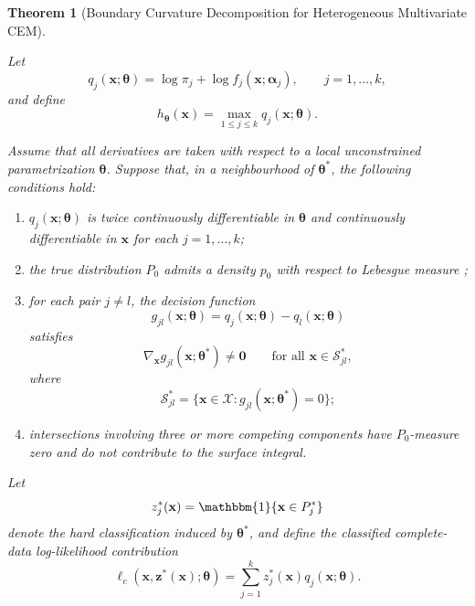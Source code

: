 \documentclass[pdflatex,sn-mathphys-ay]{sn-jnl}%
\let\oldtheta\theta
\renewcommand{\theta}{\boldsymbol{\oldtheta}}
\let\oldalpha\alpha
\renewcommand{\alpha}{\boldsymbol{\oldalpha}}
\theoremstyle{thmstyleone}%
\newtheorem{theorem}{Theorem}%
\theoremstyle{thmstyletwo}%
\theoremstyle{thmstylethree}%
\begin{document}
\begin{theorem}[Boundary Curvature Decomposition for Heterogeneous Multivariate CEM]
\label{thm:boundary_decomposition}

Let
\[
    q_j(\mathbf{x};\boldsymbol{\theta})
    =
    \log \pi_j
    +
    \log f_j(\mathbf{x};\boldsymbol{\alpha}_j),
    \qquad
    j=1,\ldots,k,
\]
and define
\[
    h_{\boldsymbol{\theta}}(\mathbf{x})
    =
    \max_{1\leq j\leq k}
    q_j(\mathbf{x};\boldsymbol{\theta}).
\]

Assume that all derivatives are taken with respect to a local unconstrained parametrization $\boldsymbol{\theta}$. Suppose that, in a neighbourhood of $\boldsymbol{\theta}^*$, the following conditions hold:

\begin{enumerate}

\item $q_j(\mathbf{x};\boldsymbol{\theta})$ is twice continuously differentiable in $\boldsymbol{\theta}$ and continuously differentiable in $\mathbf{x}$ for each $j=1,\ldots,k$;

\item the true distribution $P_0$ admits a density $p_0$ with respect to Lebesgue measure \citep{billingsley1995probability};

\item for each pair $j\neq l$, the decision function
\[
    g_{jl}(\mathbf{x};\boldsymbol{\theta})
    =
    q_j(\mathbf{x};\boldsymbol{\theta})
    -
    q_l(\mathbf{x};\boldsymbol{\theta})
\]
satisfies
\[
    \nabla_{\mathbf{x}}
    g_{jl}
    (\mathbf{x};\boldsymbol{\theta}^*)
    \neq
    \mathbf{0}
    \qquad
    \text{for all }
    \mathbf{x}
    \in
    \mathcal{S}_{jl}^*,
\]
where
\[
    \mathcal{S}_{jl}^*
    =
    \{
        \mathbf{x}\in\mathcal{X}
        :
        g_{jl}
        (\mathbf{x};\boldsymbol{\theta}^*)
        =
        0
    \};
\]

\item intersections involving three or more competing components have $P_0$-measure zero and do not contribute to the surface integral.

\end{enumerate}

Let
\[
    z_j^*(\mathbf{x})
    =
    \mathbbm{1}
    \{
        \mathbf{x}\in P_j^*
    \}
\]
denote the hard classification induced by $\boldsymbol{\theta}^*$, and define the classified complete-data log-likelihood contribution
\[
    \ell_c
    (\mathbf{x},\mathbf{z}^*(\mathbf{x});\boldsymbol{\theta})
    =
    \sum_{j=1}^k
    z_j^*(\mathbf{x})
    q_j(\mathbf{x};\boldsymbol{\theta}).
\]


\end{theorem}
\end{document}
